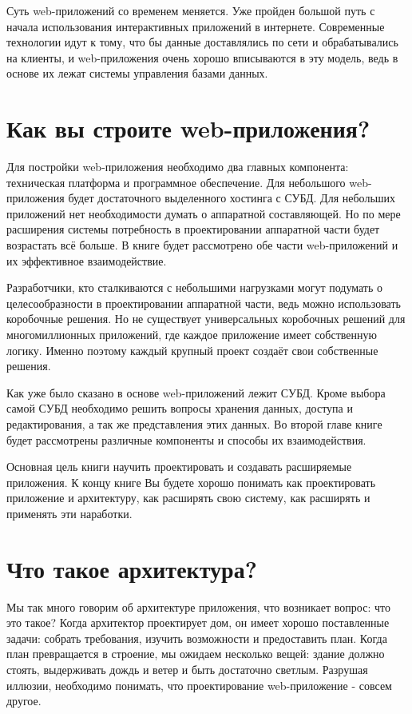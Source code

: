 Суть web-приложений со временем меняется. Уже пройден большой путь с начала использования интерактивных приложений в интернете. Современные технологии идут к тому, что бы данные доставлялись по сети и обрабатывались на клиенты, и web-приложения очень хорошо вписываются в эту модель, ведь в основе их лежат системы управления базами данных.


\section{Как вы строите web-приложения?} \label{sect1_2}

Для постройки web-приложения необходимо два главных компонента: техническая платформа и программное обеспечение. Для небольшого web-приложения будет достаточного выделенного хостинга с СУБД. Для небольших приложений нет необходимости думать о аппаратной составляющей. Но по мере расширения системы потребность в проектировании аппаратной части будет возрастать всё больше. В книге будет рассмотрено обе части web-приложений и их эффективное взаимодействие.


Разработчики, кто сталкиваются с небольшими нагрузками могут подумать о целесообразности в проектировании аппаратной части, ведь можно использовать коробочные решения. Но не существует универсальных коробочных решений для многомиллионных приложений, где  каждое приложение имеет собственную логику. Именно поэтому каждый крупный проект создаёт свои собственные решения.

Как уже было сказано в основе web-приложений лежит СУБД. Кроме выбора самой СУБД необходимо решить вопросы хранения данных, доступа и редактирования, а так же представления этих данных. Во второй главе книге будет рассмотрены различные компоненты и способы их взаимодействия.

Основная цель книги научить проектировать и создавать расширяемые приложения. К концу книге Вы будете хорошо понимать как проектировать приложение и архитектуру, как расширять свою систему, как расширять и применять эти наработки.



\section{Что такое архитектура?} \label{sect1_3}

Мы так много говорим об архитектуре приложения, что возникает вопрос: что это такое? Когда архитектор проектирует дом, он имеет хорошо поставленные задачи: собрать требования, изучить возможности и предоставить план. Когда план превращается в строение, мы ожидаем  несколько вещей: здание должно  стоять, выдерживать дождь и ветер и быть достаточно светлым. Разрушая иллюзии, необходимо понимать, что проектирование web-приложение - совсем другое.

